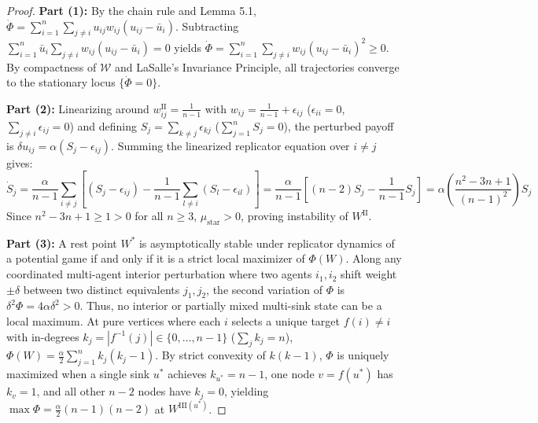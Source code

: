 \documentclass[11pt,a4paper]{article}
\begin{document}
\begin{proof}
\textbf{Part (1):} By the chain rule and Lemma 5.1, $\dot{\Phi} = \sum_{i=1}^n \sum_{j \neq i} u_{ij} w_{ij} (u_{ij} - \bar{u}_i)$. Subtracting $\sum_{i=1}^n \bar{u}_i \sum_{j \neq i} w_{ij}(u_{ij} - \bar{u}_i) = 0$ yields $\dot{\Phi} = \sum_{i=1}^n \sum_{j \neq i} w_{ij}(u_{ij} - \bar{u}_i)^2 \ge 0$. By compactness of $\mathcal{W}$ and LaSalle's Invariance Principle, all trajectories converge to the stationary locus $\{\dot{\Phi} = 0\}$.

\textbf{Part (2):} Linearizing around $w^{\text{II}}_{ij} = \frac{1}{n-1}$ with $w_{ij} = \frac{1}{n-1} + \epsilon_{ij}$ ($\epsilon_{ii} = 0$, $\sum_{j \neq i} \epsilon_{ij} = 0$) and defining $S_j = \sum_{k \neq j} \epsilon_{kj}$ ($\sum_{j=1}^n S_j = 0$), the perturbed payoff is $\delta u_{ij} = \alpha (S_j - \epsilon_{ij})$. Summing the linearized replicator equation over $i \neq j$ gives:
\begin{equation}
    \dot{S}_j = \frac{\alpha}{n-1} \sum_{i \neq j} \left[ (S_j - \epsilon_{ij}) - \frac{1}{n-1} \sum_{l \neq i} (S_l - \epsilon_{il}) \right] = \frac{\alpha}{n-1} \left[ (n-2) S_j - \frac{1}{n-1} S_j \right] = \alpha \left( \frac{n^2 - 3n + 1}{(n-1)^2} \right) S_j
\end{equation}
Since $n^2 - 3n + 1 \ge 1 > 0$ for all $n \ge 3$, $\mu_{\text{star}} > 0$, proving instability of $W^{\text{II}}$.

\textbf{Part (3):} A rest point $W^*$ is asymptotically stable under replicator dynamics of a potential game if and only if it is a strict local maximizer of $\Phi(W)$. Along any coordinated multi-agent interior perturbation where two agents $i_1, i_2$ shift weight $\pm \delta$ between two distinct equivalents $j_1, j_2$, the second variation of $\Phi$ is $\delta^2 \Phi = 4\alpha \delta^2 > 0$. Thus, no interior or partially mixed multi-sink state can be a local maximum. At pure vertices where each $i$ selects a unique target $f(i) \neq i$ with in-degrees $k_j = |f^{-1}(j)| \in \{0, \dots, n-1\}$ ($\sum_j k_j = n$), $\Phi(W) = \frac{\alpha}{2} \sum_{j=1}^n k_j(k_j - 1)$. By strict convexity of $k(k-1)$, $\Phi$ is uniquely maximized when a single sink $u^*$ achieves $k_{u^*} = n-1$, one node $v = f(u^*)$ has $k_v = 1$, and all other $n-2$ nodes have $k_j = 0$, yielding $\max \Phi = \frac{\alpha}{2}(n-1)(n-2)$ at $W^{\text{III}(u^*)}$.
\end{proof}
\end{document}
